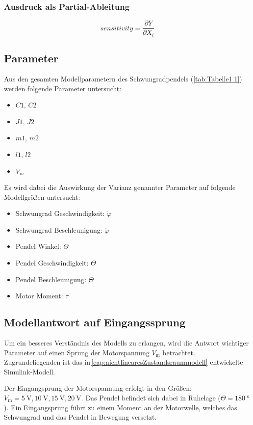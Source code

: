 \subsubsection*{Ausdruck als Partial-Ableitung}
\begin{equation}
    sensitivity=\frac{\partial Y}{\partial X_i}
\end{equation}

\subsection{Parameter}
Aus den gesamten Modellparametern des Schwungradpendels (\ref{tab:Tabelle1.1}) werden folgende Parameter untersucht:
\begin{itemize}
    \item $C1,\, C2$
    \item $J1,\, J2$
    \item $m1,\, m2$
    \item $l1,\, l2$
    \item $V_m$
\end{itemize}
Es wird dabei die Auswirkung der Varianz genannter Parameter auf folgende Modellgrößen untersucht:
\begin{itemize}
    \item Schwungrad Geschwindigkeit: $\dot\varphi$
    \item Schwungrad Beschleunigung: $\ddot\varphi$
    \item Pendel Winkel: $\Theta$
    \item Pendel Geschwindigkeit: $\dot\Theta$
    \item Pendel Beschleunigung: $\ddot\Theta$
    \item Motor Moment: $\tau$
\end{itemize}
\subsection*{Modellantwort auf Eingangssprung}

Um ein besseres Verständnis des Modells zu erlangen, wird die Antwort wichtiger Parameter auf einen Sprung der Motorspannung $V_{\mathrm{m}}$ betrachtet.
Zugrundeliegenden ist das in\,\ref{cap:nichtlinearesZustandsraummodell} entwickelte Simulink-Modell.

Der Eingangsprung der Motorspannung erfolgt in den Größen: $V_{\mathrm{m}}=\SI{5}{\volt},\SI{10}{\volt},\SI{15}{\volt},\SI{20}{\volt}$.
Das Pendel befindet sich dabei in Ruhelage ($\Theta=\SI{180}{\degree}$). 
Ein Eingangsprung führt zu einem Moment an der Motorwelle, welches das Schwungrad und das Pendel in Bewegung versetzt.\\

